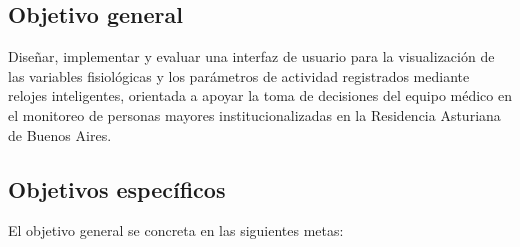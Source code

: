 \subsection{Objetivo general}
Diseñar, implementar y evaluar una interfaz de usuario para la visualización de las variables fisiológicas y los parámetros de actividad registrados mediante relojes inteligentes, orientada a apoyar la toma de decisiones del equipo médico en el monitoreo de personas mayores institucionalizadas en la Residencia Asturiana de Buenos Aires.\\


\subsection{Objetivos específicos}
El objetivo general se concreta en las siguientes metas:\\



